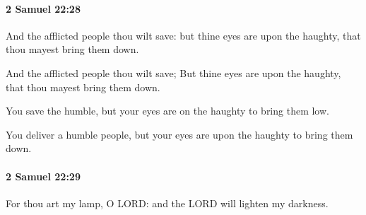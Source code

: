 		\paragraph{2 Samuel 22:28} %
			\label{2SAMUEL-22-28}

			And the afflicted people thou wilt save: but thine eyes are upon the haughty, that thou mayest bring them down.

			\begin{versebox}
					\item[BHS] 
					\item[ASV] And the afflicted people thou wilt save; But thine eyes are upon the haughty, that thou mayest bring them down.
					\item[NIV] You save the humble, but your eyes are on the haughty to bring them low.
					\item[NRSV] You deliver a humble people, but your eyes are upon the haughty to bring them down.
			\end{versebox}

		\paragraph{2 Samuel 22:29} %
			\label{2SAMUEL-22-29}

			For thou art my lamp, O LORD: and the LORD will lighten my darkness.

